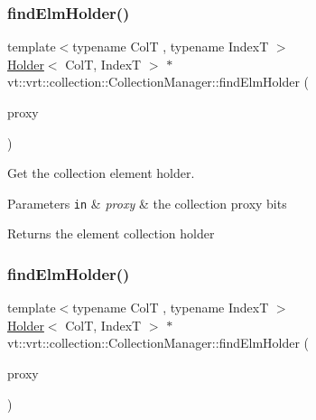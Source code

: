 \subsubsection{\texorpdfstring{find\+Elm\+Holder()}{findElmHolder()}\hspace{0.1cm}{\footnotesize\ttfamily [1/2]}}
{\footnotesize\ttfamily template$<$typename ColT , typename IndexT $>$ \\
\hyperlink{structvt_1_1vrt_1_1collection_1_1_holder}{Holder}$<$ ColT, IndexT $>$ $\ast$ vt\+::vrt\+::collection\+::\+Collection\+Manager\+::find\+Elm\+Holder (\begin{DoxyParamCaption}\item[{\hyperlink{namespacevt_a1b417dd5d684f045bb58a0ede70045ac}{Virtual\+Proxy\+Type} const \&}]{proxy }\end{DoxyParamCaption})\hspace{0.3cm}{\ttfamily [private]}}



Get the collection element holder. 


\begin{DoxyParams}[1]{Parameters}
\mbox{\tt in}  & {\em proxy} & the collection proxy bits\\
\hline
\end{DoxyParams}
\begin{DoxyReturn}{Returns}
the element collection holder 
\end{DoxyReturn}
\mbox{\label{structvt_1_1vrt_1_1collection_1_1_collection_manager_aa7f2e2fbbd73a3d7111904c0b31807e6}} 
\subsubsection{\texorpdfstring{find\+Elm\+Holder()}{findElmHolder()}\hspace{0.1cm}{\footnotesize\ttfamily [2/2]}}
{\footnotesize\ttfamily template$<$typename ColT , typename IndexT $>$ \\
\hyperlink{structvt_1_1vrt_1_1collection_1_1_holder}{Holder}$<$ ColT, IndexT $>$ $\ast$ vt\+::vrt\+::collection\+::\+Collection\+Manager\+::find\+Elm\+Holder (\begin{DoxyParamCaption}\item[{\hyperlink{structvt_1_1vrt_1_1collection_1_1_collection_manager_a56458ed7f9bb22b631b9b3a745f42f94}{Collection\+Proxy\+Wrap\+Type}$<$ ColT $>$}]{proxy }\end{DoxyParamCaption})\hspace{0.3cm}{\ttfamily [private]}}




